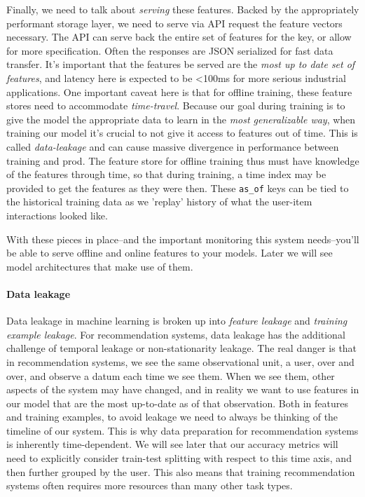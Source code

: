 Finally, we need to talk about \emph{serving} these features. Backed by the appropriately performant storage layer, we need to serve via API request the feature vectors necessary. The API can serve back the entire set of features for the key, or allow for more specification. Often the responses are JSON serialized for fast data transfer. It's important that the features be served are the \emph{most up to date set of features}, and latency here is expected to be <100ms for more serious industrial applications. One important caveat here is that for offline training, these feature stores need to accommodate \emph{time-travel}. Because our goal during training is to give the model the appropriate data to learn in the \emph{most generalizable way}, when training our model it's crucial to not give it access to features out of time. This is called \emph{data-leakage} and can cause massive divergence in performance between training and prod. The feature store for offline training thus must have knowledge of the features through time, so that during training, a time index may be provided to get the features as they were then. These \lstinline{as_of} keys can be tied to the historical training data as we 'replay' history of what the user-item interactions looked like.

With these pieces in place–and the important monitoring this system needs–you'll be able to serve offline and online features to your models. Later we will see model architectures that make use of them.

\paragraph{Data leakage}

Data leakage in machine learning is broken up into \emph{feature leakage} and \emph{training example leakage}. For recommendation systems, data leakage has the additional challenge of temporal leakage or non-stationarity leakage. The real danger is that in recommendation systems, we see the same observational unit, a user, over and over, and observe a datum each time we see them. When we see them, other aspects of the system may have changed, and in reality we want to use features in our model that are the most up-to-date as of that observation. Both in features and training examples, to avoid leakage we need to always be thinking of the timeline of our system. This is why data preparation for recommendation systems is inherently time-dependent. We will see later that our accuracy metrics will need to explicitly consider train-test splitting with respect to this time axis, and then further grouped by the user. This also means that training recommendation systems often requires more resources than many other task types.